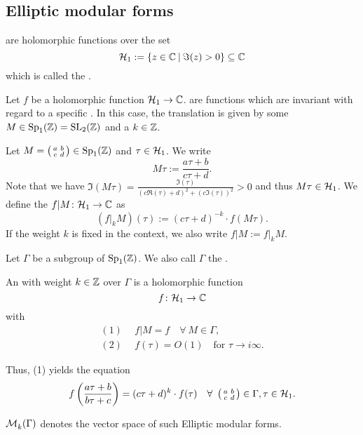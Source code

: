 

\subsection{Elliptic modular forms}
 are holomorphic functions over the set
\[ \SiegelHalfPlane_1 := \Set{z \in \C}{\Im(z) > 0} \subseteq \C \]
which is called the .

Let $f$ be a holomorphic function $\mathcal{H}_1 \rightarrow \mathbb{C}$.  are functions which are invariant with regard to a specific . In this case, the translation is given by some $M \in \operatorname{Sp}_1(\mathbb{Z}) = \operatorname{SL}_2(\mathbb{Z})$ and a  $k \in \mathbb{Z}$.

Let $M = \left( \begin{smallmatrix} a & b \\ c & d \end{smallmatrix} \right) \in \operatorname{Sp}_1(\mathbb{Z})$ and $\tau \in \mathcal{H}_1$. We write
\[ M \tau := \frac{a \tau + b}{c \tau + d} . \]
Note that we have $\Im(M\tau) = \frac{\Im(\tau)}{(c\Re(\tau)+d)^2 + (c \Im(\tau))^2} > 0$ and thus $M \tau \in \mathcal{H}_1$.
We define the  $f | M \colon \mathcal{H}_1 \rightarrow \mathbb{C}$ as
\[ (f |_k M) (\tau) :=  (c \tau + d)^{-k} \cdot f(M \tau) . \]
If the weight $k$ is fixed in the context, we also write $f | M := f |_k M$.

Let $\Gamma$ be a subgroup of $\operatorname{Sp}_1(\mathbb{Z})$. We also call $\Gamma$ the .

An  with weight $k \in \mathbb{Z}$ over $\Gamma$ is a holomorphic function
\[ f \colon \mathcal{H}_1 \rightarrow \mathbb{C} \]
with
\begin{align*}
(1) \ \ & f | M  = f \quad \forall \ M \in \Gamma, \\
(2) \ \ & f(\tau) = O(1) \quad \text{for } \tau \rightarrow i \infty .
\end{align*}

Thus, (1) yields the equation
\[ f\left(\frac{a \tau + b}{b \tau + c}\right) = (c \tau + d)^k \cdot f(\tau) \quad \forall \ \left( \begin{smallmatrix} a & b \\ c & d \end{smallmatrix} \right) \in \Gamma, \tau \in \mathcal{H}_1 . \]

$\operatorname{\mathcal{M}}^{}_{k} (\Gamma)$ denotes the vector space of such Elliptic modular forms.

